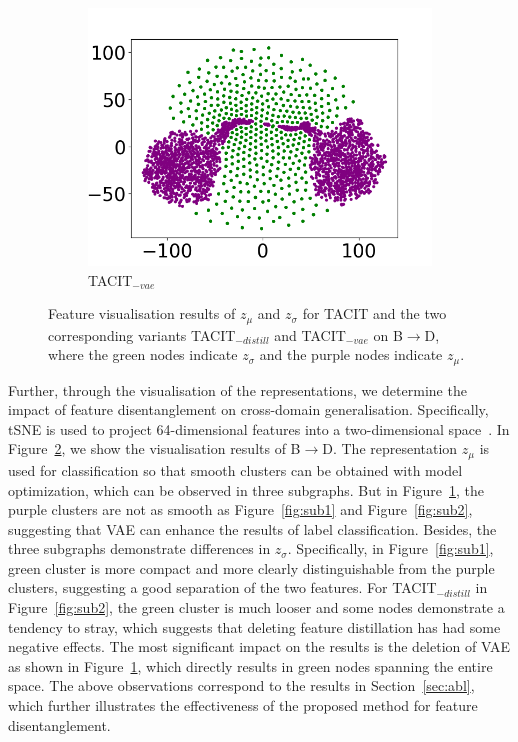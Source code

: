 \documentclass[letterpaper]{article} %
\begin{document}
\begin{figure}[t]
\begin{subfigure}{0.46\linewidth}
		\includegraphics[width=\linewidth]{vis-vae.png}
		\caption{TACIT$_{-vae}$}
		\label{fig:sub3}
	\end{subfigure}
	\caption{Feature visualisation results of $z_\mu$ and $z_\sigma$ for TACIT and the two corresponding variants TACIT$_{-distill}$ and TACIT$_{-vae}$ on B$\to$D, where the green nodes indicate $z_\sigma$ and the purple nodes indicate $z_\mu$. }
	\label{fig:vis}
\end{figure}

Further, through the visualisation of the representations, we determine the impact of feature disentanglement on cross-domain generalisation. Specifically, tSNE is used to project 64-dimensional features into a two-dimensional space~\cite{vandermaaten08a}. In Figure~\ref{fig:vis}, we show the visualisation results of B$\to$D. The representation $z_\mu$ is used for classification so that smooth clusters can be obtained with model optimization, which can be observed in three subgraphs. But in Figure~\ref{fig:sub3}, the purple clusters are not as smooth as Figure~\ref{fig:sub1} and Figure~\ref{fig:sub2}, suggesting that VAE can enhance the results of label classification. Besides, the three subgraphs demonstrate differences in $z_\sigma$. Specifically, in Figure~\ref{fig:sub1}, green cluster is more compact and more clearly distinguishable from the purple clusters, suggesting a good separation of the two features. For TACIT$_{-distill}$ in Figure~\ref{fig:sub2}, the green cluster is much looser and some nodes demonstrate a tendency to stray, which suggests that deleting feature distillation has had some negative effects. The most significant impact on the results is the deletion of VAE as shown in Figure~\ref{fig:sub3}, which directly results in green nodes spanning the entire space. The above observations correspond to the results in Section~\ref{sec:abl}, which further illustrates the effectiveness of the proposed method for feature disentanglement.
\end{document}
